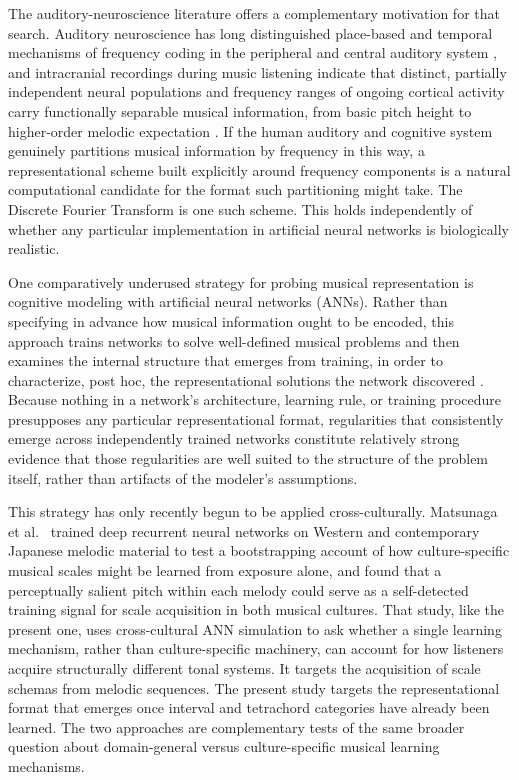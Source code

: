 \documentclass[pdflatex,sn-nature]{sn-jnl}
\begin{document}
The auditory-neuroscience literature offers a complementary motivation for that search.
Auditory neuroscience has long distinguished place-based and temporal mechanisms of
frequency coding in the peripheral and central auditory system \cite{oxenham2018}, and
intracranial recordings during music listening indicate that distinct, partially
independent neural populations and frequency ranges of ongoing cortical activity carry
functionally separable musical information, from basic pitch height to higher-order
melodic expectation \cite{sankaran2024}. If the human auditory and cognitive system genuinely partitions musical information by
frequency in this way, a representational scheme built explicitly around frequency
components is a natural computational candidate for the format such partitioning might
take. The Discrete Fourier Transform is one such scheme. This holds independently of
whether any particular implementation in artificial neural networks is biologically
realistic.

One comparatively underused strategy for probing musical representation is cognitive
modeling with artificial neural networks (ANNs). Rather than specifying in advance how
musical information ought to be encoded, this approach trains networks to solve
well-defined musical problems and then examines the internal structure that emerges from
training, in order to characterize, post hoc, the representational solutions the network
discovered \cite{dawson2018}. Because nothing in a network's architecture, learning
rule, or training procedure presupposes any particular representational format,
regularities that consistently emerge across independently trained networks constitute
relatively strong evidence that those regularities are well suited to the structure of the
problem itself, rather than artifacts of the modeler's assumptions.

This strategy has only recently begun to be applied cross-culturally.
Matsunaga et al.\ \cite{matsunaga2026} trained deep recurrent neural networks on Western and contemporary
Japanese melodic material to test a bootstrapping account of how culture-specific musical
scales might be learned from exposure alone, and found that a perceptually salient pitch
within each melody could serve as a self-detected training signal for scale acquisition in
both musical cultures. That study, like the present one, uses cross-cultural ANN
simulation to ask whether a single learning mechanism, rather than culture-specific
machinery, can account for how listeners acquire structurally different tonal systems. It
targets the acquisition of scale schemas from melodic sequences. The present study targets
the representational format that emerges once interval and tetrachord categories have
already been learned. The two approaches are complementary tests of the same broader
question about domain-general versus culture-specific musical learning mechanisms.
\end{document}
